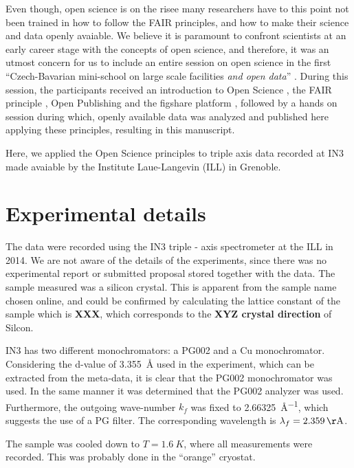 \documentclass[aps,prx,reprint,amsmath,amssymb,superscriptaddress,showpacs]{revtex4-1}
\begin{document}
Even though, open science is on the risee many researchers have to this point not been trained in how to follow the FAIR principles, and how to make their science and data openly avaiable. 
We believe it is paramount to confront scientists at an early career stage with the concepts of open science, and therefore, it was an utmost concern for us to include an entire session on open science in the first ``Czech-Bavarian mini-school on large scale facilities \emph{and open data}'' \cite{mini-school}.
During this session, the participants received an introduction to Open Science \cite{foster}, the FAIR principle \cite{FAIR}, Open Publishing \cite{arXiv} and the figshare platform \cite{figshare}, followed by a hands on session during which, openly available data was analyzed and published here applying these principles, resulting in this manuscript.
 
Here, we applied the Open Science principles to triple axis data recorded at IN3 \cite{data} made avaiable by the Institute Laue-Langevin (ILL) in Grenoble.

\section{Experimental details}

The data were recorded using the IN3 triple - axis spectrometer \cite{IN3} at the ILL in 2014.
We are not aware of the details of the experiments, since there was no experimental report or submitted proposal stored together with the data.
The sample measured was a silicon crystal. 
This is apparent from the sample name chosen online, and could be confirmed by calculating the lattice constant of the sample which is \textbf{XXX}, which corresponds to the \textbf{XYZ crystal direction} of Silcon.

IN3 has two different monochromators: a PG002 and a Cu monochromator.
Considering the d-value of \SI{3.355}{\AA} used in the experiment, which can be extracted from the meta-data, it is clear that the PG002 monochromator was used.
In the same manner it was determined that the PG002 analyzer was used. 
Furthermore, the outgoing wave-number $k_f$ was fixed to \SI{2.66325}{\AA^{-1}}, which suggests the use of a PG filter. 
The corresponding wavelength is $\lambda_f=\SI{2.359}{\AA}$.

The sample was cooled down to $T = \SI{1.6}{K}$, where all measurements were recorded. 
This was probably done in the ``orange'' cryostat.
\end{document}
